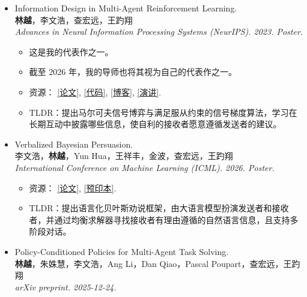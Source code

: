 \documentclass[a4paper,20pt]{article}
\begin{document}
\begin{itemize}[leftmargin=*,itemsep=0pt,topsep=0pt,partopsep=0pt]
    \item Information Design in Multi-Agent Reinforcement Learning. \\
          \textbf{林越}，李文浩，查宏远，王趵翔 \\
          \textit{Advances in Neural Information Processing Systems (NeurIPS). 2023. Poster.}
          \begin{itemize}[itemsep=0pt,topsep=0pt,partopsep=0pt]
              \item 这是我的代表作之一。
              \item 截至 2026 年，我的导师也将其视为自己的代表作之一。
              \item 资源：
                    \href{https://arxiv.org/abs/2305.06807}{[论文]},
                    \href{https://github.com/YueLin301/InformationDesignMARL}{[代码]},
                    \href{https://yuelin301.github.io/posts/IDMARL/}{[博客]},
                    \href{https://www.youtube.com/watch?v=yhVlpv_1Pg4}{[演讲]}.
              \item TLDR：提出马尔可夫信号博弈与满足服从约束的信号梯度算法，学习在长期互动中披露哪些信息，使自利的接收者愿意遵循发送者的建议。
          \end{itemize}
    \item Verbalized Bayesian Persuasion. \\
          李文浩，\textbf{林越}，Yun Hua，王祥丰，金波，查宏远，王趵翔 \\
          \textit{International Conference on Machine Learning (ICML). 2026. Poster.}
          \begin{itemize}[itemsep=0pt,topsep=0pt,partopsep=0pt]
              \item 资源：
                    \href{https://openreview.net/forum?id=dc0WdvWSnB}{[论文]},
                    \href{https://arxiv.org/abs/2502.01587}{[预印本]}.
              \item TLDR：提出语言化贝叶斯劝说框架，由大语言模型扮演发送者和接收者，并通过均衡求解器寻找接收者有理由遵循的自然语言信息，且支持多阶段对话。
          \end{itemize}
    \item Policy-Conditioned Policies for Multi-Agent Task Solving. \\
          \textbf{林越}，朱姝慧，李文浩，Ang Li，Dan Qiao，Pascal Poupart，查宏远，王趵翔 \\
          \textit{arXiv preprint. 2025-12-24.}

\end{itemize}
\end{document}
